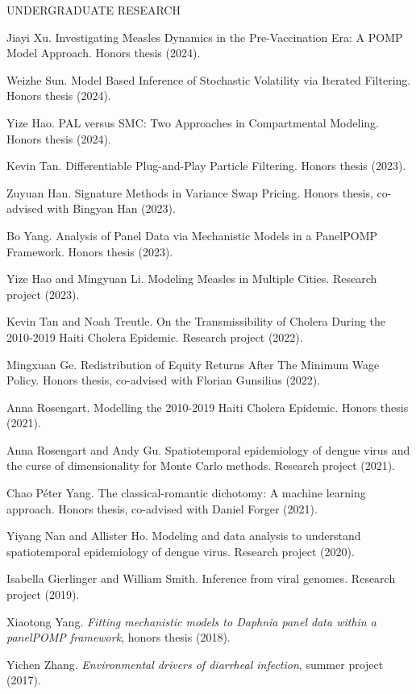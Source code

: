 \lsp
\begin{reflist}{UNDERGRADUATE RESEARCH}

\item{Jiayi Xu}. Investigating Measles Dynamics in the Pre-Vaccination Era: A POMP Model Approach. Honors thesis (2024).
\item{Weizhe Sun}. Model Based Inference of Stochastic Volatility via Iterated Filtering. Honors thesis (2024).
\item{Yize Hao}. PAL versus SMC: Two Approaches in Compartmental Modeling. Honors thesis (2024).
\item{Kevin Tan}. Differentiable Plug-and-Play Particle Filtering. Honors thesis (2023).
\item{Zuyuan Han}. Signature Methods in Variance Swap Pricing. Honors thesis, co-advised with Bingyan Han (2023).  
\item{Bo Yang}. Analysis of Panel Data via Mechanistic Models in a PanelPOMP Framework. Honors thesis (2023).
  \item{Yize Hao and Mingyuan Li}. Modeling Measles in Multiple Cities. Research project (2023).
\item{Kevin Tan and Noah Treutle}. On the Transmissibility of Cholera During the 2010-2019 Haiti Cholera Epidemic. Research project (2022).
\item{Mingxuan Ge}. Redistribution of Equity Returns After The Minimum Wage Policy. Honors thesis, co-advised with Florian Gunsilius (2022).
\item{Anna Rosengart}. Modelling the 2010-2019 Haiti Cholera Epidemic. Honors thesis (2021).
\item{Anna Rosengart and Andy Gu}. Spatiotemporal epidemiology of dengue virus and the curse of dimensionality for Monte Carlo methods. Research project (2021).
  \item{Chao P{\'e}ter Yang}. The classical-romantic dichotomy: A machine learning approach. Honors thesis, co-advised with Daniel Forger (2021).
  \item{Yiyang Nan and Allister Ho}. Modeling and data analysis to understand spatiotemporal epidemiology of dengue virus. Research project (2020).
  \item{Isabella Gierlinger and William Smith}. Inference from viral genomes. Research project (2019).
  \item{Xiaotong Yang}. {\em Fitting mechanistic models to Daphnia panel data within a panelPOMP framework}, honors thesis (2018).
\item{Yichen Zhang}. {\em Environmental drivers of diarrheal infection}, summer project (2017).

\end{reflist}
